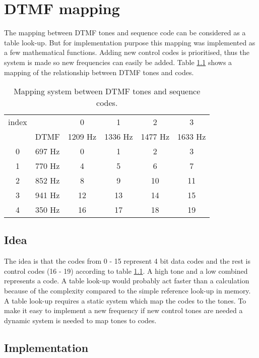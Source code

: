 \chapter{DTMF mapping}\label{app:physical_encode}
The mapping between DTMF tones and sequence code can be considered as a table look-up. But for implementation purpose this mapping was implemented as a few mathematical functions. 
 Adding new control codes is prioritised, thus the system is made so new frequencies can easily be added.
Table \ref{app_dtmf:DTMF_mapping_table} shows a mapping of the relationship between DTMF tones and codes. 

\begin{table}[htb]
	\begin{center}
		\begin{tabular}{c c|c c c c}
 		index & & 0 & 1 & 2 & 3 \\
		& DTMF & 1209 Hz & 1336 Hz & 1477 Hz & 1633 Hz \\
		\hline
		0 & 697 Hz & 0 & 1 & 2 & 3 \\
		1 & 770 Hz & 4 & 5 & 6 & 7 \\
		2 & 852 Hz & 8 & 9 & 10 & 11 \\
		3 & 941 Hz & 12 & 13 & 14 & 15 \\
		4 & 350 Hz & 16 & 17 & 18 & 19 \\
		\end{tabular}
	\end{center}
	\caption{Mapping system between DTMF tones and sequence codes.}
	\label{app_dtmf:DTMF_mapping_table}
\end{table}

	\section{Idea}
	The idea is that the codes from 0 - 15 represent 4 bit data codes and the rest is control codes (16 - 19) according to table \ref{app_dtmf:DTMF_mapping_table}. A high tone and a low combined represents a code. A table look-up would probably act faster than a calculation because of the complexity compared to the simple reference look-up in memory. A table look-up requires a static system which map the codes to the tones. To make it easy to implement a new frequency if new control tones are needed a dynamic system is needed to map tones to codes.
	
	\section{Implementation}

